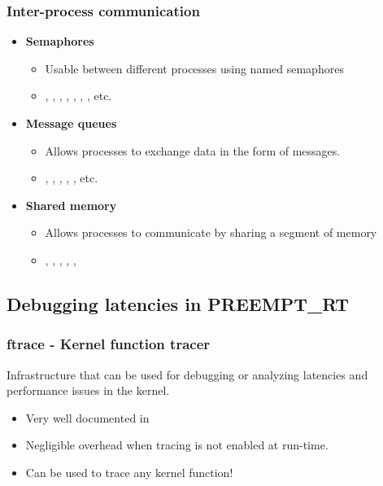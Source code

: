\begin{frame}
  \frametitle{Inter-process communication}
  \begin{itemize}
  \item {\bf Semaphores}
    \begin{itemize}
    \item Usable between different processes using named semaphores
    \item {}, , ,
      , , ,
      , etc.
    \end{itemize}
  \item {\bf Message queues}
    \begin{itemize}
    \item Allows processes to exchange data in the form of messages.
    \item {}, , ,
      , , etc.
    \end{itemize}
  \item {\bf Shared memory}
    \begin{itemize}
    \item Allows processes to communicate by sharing a segment of
      memory
    \item {}, , ,
      , , 
    \end{itemize}
  \end{itemize}
\end{frame}

\subsection{Debugging latencies in PREEMPT\_RT}

\begin{frame}
  \frametitle{ftrace - Kernel function tracer}

  Infrastructure that can be used for debugging or analyzing latencies
  and performance issues in the kernel.

  \begin{itemize}
  \item Very well documented in 
  \item Negligible overhead when tracing is not enabled at run-time.
  \item Can be used to trace any kernel function!
  \end{itemize}
\end{frame}


